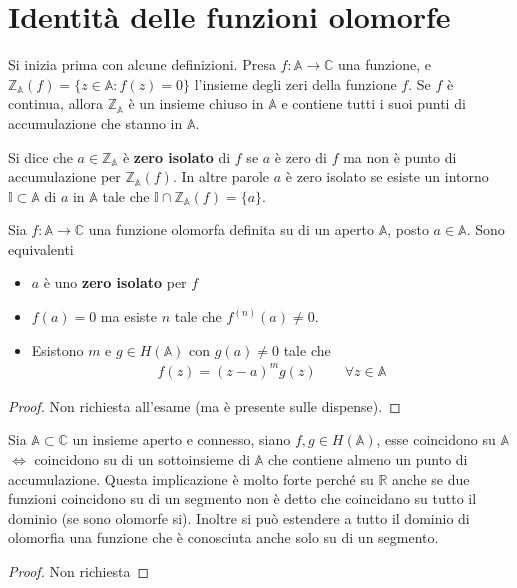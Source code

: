\documentclass[a4paper, oneside]{article}
\begin{document}
\section{Identità delle funzioni olomorfe}
Si inizia prima con alcune definizioni. Presa $f : \mathbb{A} \to \mathbb{C}$ una 
funzione, e $\mathbb{Z}_\mathbb{A}(f) = \{z \in \mathbb{A} :  f(z) = 0\}$ l'insieme 
degli zeri della funzione $f$. Se $f$ è continua, allora $\mathbb{Z}_\mathbb{A}$ è un insieme 
chiuso in $\mathbb{A}$ e contiene tutti i suoi punti di accumulazione che stanno in $\mathbb{A}$. 
\begin{definition}
    Si dice che $a \in \mathbb{Z}_\mathbb{A}$ è \textbf{zero isolato} di $f$ se $a$ è zero di 
    $f$ ma non è punto di accumulazione per $\mathbb{Z}_\mathbb{A}(f)$. In altre parole $a$ è zero 
    isolato se esiste un intorno $\mathbb{I} \subset \mathbb{A}$ di $a$ in $\mathbb{A}$ tale che
    $\mathbb{I} \cap \mathbb{Z}_\mathbb{A}(f) = \{a\}$.
\end{definition}
\begin{theorem}
    Sia $f : \mathbb{A} \to \mathbb{C}$ una funzione olomorfa definita su 
    di un aperto $\mathbb{A}$, posto $a \in \mathbb{A}$. Sono equivalenti
    \begin{itemize}
        \item $a$ è uno \textbf{zero isolato} per $f$
        \item $f(a) = 0$ ma esiste $n$ tale che $f^{(n)}(a) \neq 0$.
        \item Esistono $m$ e $g \in H(\mathbb{A})$ con $g(a) \neq 0$ tale che 
        \begin{gather*}
            f(z) = (z - a)^{m}g(z) \qquad \forall z \in \mathbb{A}
        \end{gather*}
    \end{itemize}
\end{theorem}
\begin{proof}
    Non richiesta all'esame (ma è presente sulle dispense).
\end{proof}


\begin{theorem}
    Sia $\mathbb{A} \subset \mathbb{C}$ un insieme aperto e connesso, 
    siano $f, g \in H(\mathbb{A})$, esse coincidono su $\mathbb{A}$ 
    $\Longleftrightarrow$ coincidono su di un sottoinsieme di $\mathbb{A}$
    che contiene almeno un punto di accumulazione. Questa implicazione è 
    molto forte perché su $\mathbb{R}$ anche se due funzioni coincidono su di un 
    segmento non è detto che coincidano su tutto il dominio (se sono olomorfe si).
    Inoltre si può estendere a tutto il dominio di olomorfia una funzione che è 
    conosciuta anche solo su di un segmento. 
\end{theorem}
\begin{proof}
    Non richiesta
\end{proof}
\end{document}
